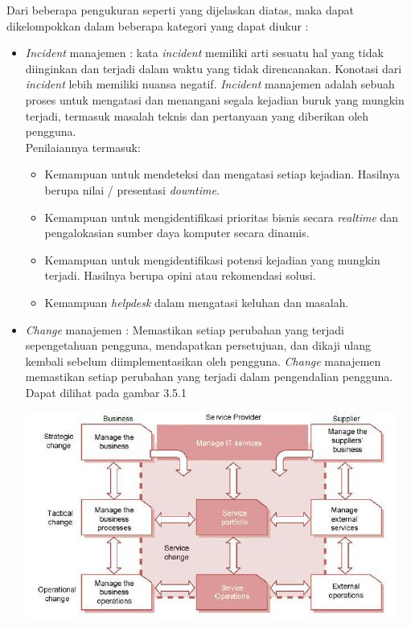 Dari beberapa pengukuran seperti yang dijelaskan diatas, maka dapat dikelompokkan dalam beberapa kategori yang dapat diukur :\\
\begin{itemize}
\item \textit{Incident} manajemen : kata \textit{incident} memiliki arti sesuatu hal yang tidak diinginkan dan terjadi dalam waktu yang tidak direncanakan. Konotasi dari \textit{incident} lebih memiliki nuansa negatif. \textit{Incident} manajemen adalah sebuah proses untuk mengatasi dan menangani segala kejadian buruk yang mungkin terjadi, termasuk masalah teknis dan pertanyaan yang diberikan oleh pengguna.\\
Penilaiannya termasuk:
\begin{itemize}
\item Kemampuan untuk mendeteksi dan mengatasi setiap kejadian. Hasilnya berupa nilai / presentasi \textit{downtime}.
\item Kemampuan untuk mengidentifikasi prioritas bisnis secara \textit{realtime} dan pengalokasian sumber daya komputer secara dinamis.
\item Kemampuan untuk mengidentifikasi potensi kejadian yang mungkin terjadi. Hasilnya berupa opini atau rekomendasi solusi.
\item Kemampuan \textit{helpdesk} dalam mengatasi keluhan dan masalah.
\end{itemize}
\item \textit{Change} manajemen : Memastikan setiap perubahan yang terjadi sepengetahuan pengguna, mendapatkan persetujuan, dan dikaji ulang kembali sebelum diimplementasikan oleh pengguna. \textit{Change} manajemen memastikan setiap perubahan yang terjadi dalam pengendalian pengguna. Dapat dilihat pada gambar 3.5.1
\begin{center}
\includegraphics[scale=1]{Gambar351.jpg}\\ 

\end{center}
\end{itemize}

